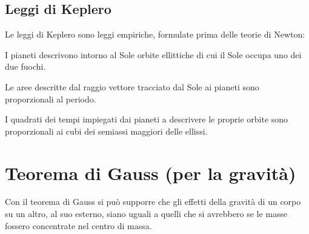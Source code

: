 \subsection{Leggi di Keplero}
Le leggi di Keplero sono leggi empiriche, formulate prima delle
teorie di Newton:
\begin{legge}
I pianeti descrivono intorno al Sole orbite ellittiche di cui il Sole occupa uno dei due fuochi. \end{legge}
\begin{legge}
 Le aree descritte dal raggio vettore tracciato dal Sole ai pianeti sono proporzionali al periodo.
\end{legge}
\begin{legge}
I quadrati dei tempi impiegati dai pianeti a descrivere le proprie orbite sono proporzionali ai cubi dei semiassi maggiori delle ellissi.
\end{legge}


\section{Teorema di Gauss (per la gravità)}
Con il teorema di Gauss si può supporre che gli effetti della
gravità di un corpo su un altro, al suo esterno, siano uguali a
quelli che si avrebbero se le masse fossero concentrate nel centro
di massa.



